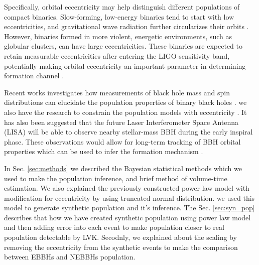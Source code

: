 \documentclass[twocolumn,prd,nofootinbib]{revtex4}
\begin{document}
Specifically, orbital eccentricity may help distinguish different populations of compact binaries. Slow-forming, low-energy binaries tend to start with low eccentricities, and gravitational wave radiation further circularizes their orbits \cite{Peters-1964}. However, binaries formed in more violent, energetic environments, such as globular clusters, can have large eccentricities. These binaries are expected to retain measurable eccentricities after entering the LIGO sensitivity band, potentially making orbital eccentricity an important parameter in determining formation channel \cite{Rod-2018,zevin-samsing-2019}.



Recent works investigates how measurements of black hole mass and spin distributions can elucidate the population properties of binary black holes \cite{Dan_2019,Michael-2015,Mandel_2017_Errors,samsing-hamers-2019,belczynski-2016,Colm-2017,Akinobu-2017,Michael-zevin-2017,farr-2017-nature,Richard-2017-natal-kicks,Dan-Richard-2018}. we also have the research to constrain the population models with eccentricity \cite{lower-2018-ecc-pop}. It has also been suggested that the future
Laser Interferometer Space Antenna (LISA) will be able to
observe nearby stellar-mass BBH during the early inspiral
phase. These observations would allow for long-term
tracking of BBH orbital properties which can be used to
infer the formation mechanism \cite{Breivik-2016}.



In Sec. \ref{sec:methods} we described the Bayesian statistical methods which we used to make the population inference, and brief method of volume-time estimation. We also explained the previously constructed\cite{fishbach-2017,2018talbot_bbh_model} power law model with modification for eccentricity by using truncated normal distribution. we used this model to generate synthetic population and it's inference. The Sec. \ref{sec:syn_pop} describes that how we have created synthetic population using power law model and then adding error into each event to make population closer to real population detectable by LVK. Secodnly, we explained about the scaling by removing the eccentricity from the synthetic events to make the comparison between EBBHs and NEBBHs population. 

\end{document}

